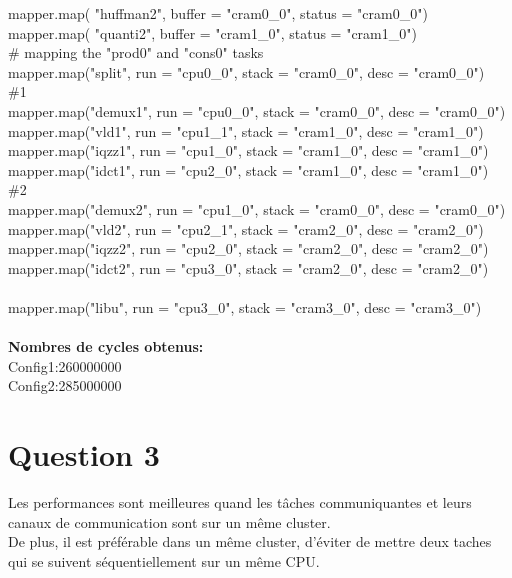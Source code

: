\documentclass[12pt]{article}
\begin{document}
mapper.map( "huffman2",    buffer = "cram0\_0", status = "cram0\_0")\\
mapper.map( "quanti2",     buffer = "cram1\_0", status = "cram1\_0")\\
\# mapping the "prod0" and "cons0" tasks\\
mapper.map("split",  run = "cpu0\_0", stack = "cram0\_0", desc  = "cram0\_0")\\
\#1\\
mapper.map("demux1", run = "cpu0\_0", stack = "cram0\_0", desc  = "cram0\_0")\\
mapper.map("vld1",   run = "cpu1\_1", stack = "cram1\_0", desc  = "cram1\_0")\\
mapper.map("iqzz1",  run = "cpu1\_0", stack = "cram1\_0", desc  = "cram1\_0")\\
mapper.map("idct1",  run = "cpu2\_0", stack = "cram1\_0", desc  = "cram1\_0")\\
\#2\\
mapper.map("demux2", run = "cpu1\_0", stack = "cram0\_0", desc  = "cram0\_0")\\
mapper.map("vld2",   run = "cpu2\_1", stack = "cram2\_0", desc  = "cram2\_0")\\
mapper.map("iqzz2",  run = "cpu2\_0", stack = "cram2\_0", desc  = "cram2\_0")\\
mapper.map("idct2",  run = "cpu3\_0", stack = "cram2\_0", desc  = "cram2\_0")\\
\\
mapper.map("libu",   run = "cpu3\_0", stack = "cram3\_0", desc  = "cram3\_0")\\
\\
\textbf{Nombres de cycles obtenus:}\\
Config1:260000000 \\
Config2:285000000 \\

\section*{Question 3}
Les performances sont meilleures quand les tâches communiquantes et leurs canaux de communication sont sur un même cluster.\\
De plus, il est préférable dans un même cluster, d'éviter de mettre deux taches qui se suivent séquentiellement sur un même CPU.
\end{document}
